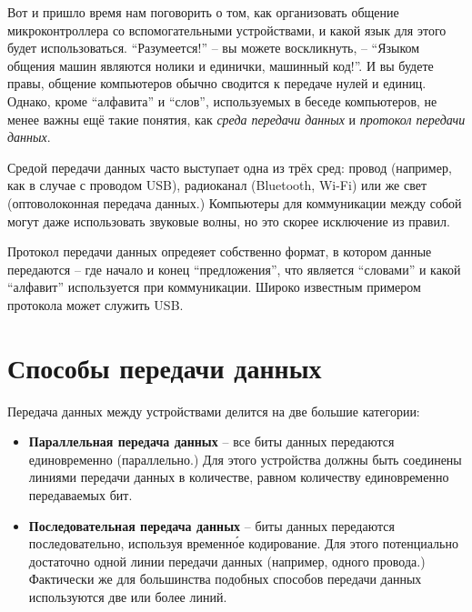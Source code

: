 \documentclass[../sparc.tex]{subfiles}
\begin{document}
Вот и пришло время нам поговорить о том, как организовать общение
микроконтроллера со вспомогательными устройствами, и какой язык для этого будет
использоваться.  ``Разумеется!'' -- вы можете воскликнуть, -- ``Языком общения
машин являются нолики и единички, машинный код!''.  И вы будете правы, общение
компьютеров обычно сводится к передаче нулей и единиц.  Однако, кроме
``алфавита'' и ``слов'', используемых в беседе компьютеров, не менее важны ещё
такие понятия, как \emph{среда передачи данных} и \emph{протокол передачи
данных}.

Средой передачи данных часто выступает одна из трёх сред: провод (например, как
в случае с проводом USB), радиоканал (Bluetooth, Wi-Fi) или же свет
(оптоволоконная передача данных.)  Компьютеры для коммуникации между собой могут
даже использовать звуковые волны, но это скорее исключение из правил.

Протокол передачи данных опредеяет собственно формат, в котором данные
передаются -- где начало и конец ``предложения'', что является ``словами'' и
какой ``алфавит'' используется при коммуникации.  Широко известным примером
протокола может служить USB.

\section{Способы передачи данных}


Передача данных между устройствами делится на две большие категории:

\begin{itemize}
\item \textbf{Параллельная передача данных} -- все биты данных передаются
  единовременно (параллельно.)  Для этого устройства должны быть соединены
  линиями передачи данных в количестве, равном количеству единовременно
  передаваемых бит.
\item \textbf{Последовательная передача данных} -- биты данных передаются
  последовательно, используя временн\'{о}е кодирование.  Для этого потенциально
  достаточно одной линии передачи данных (например, одного провода.) Фактически
  же для большинства подобных способов передачи данных используются две или
  более линий.
\end{itemize}
\end{document}
